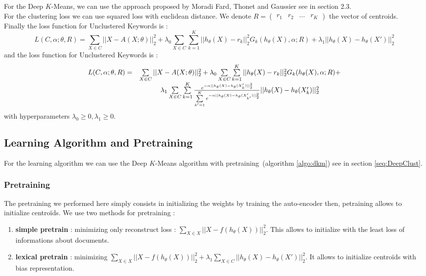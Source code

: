 For the Deep $K$-Means, we can use the approach proposed by Moradi Fard, Thonet and Gaussier 
\cite{Deap-K-Means} see in section 2.3.\\
For the clustering loss we can use squared loss with euclidean distance. We
denote $R = \begin{pmatrix} r_1 & r_2 & ... & r_K\end{pmatrix}$ the vector of
centroids.\\
Finally the loss function for Unclustered Keywords is :
\begin{equation}
L(C ,\alpha;\theta,R) = \sum\limits_{X \in C} ||X - A(X;\theta)||_2^2 + 
\lambda_0 \sum\limits_{X \in C}\sum\limits_{k=1}^K||h_\theta(X) - r_k ||_2^2 G_{k}(h_\theta(X), \alpha; R) + 
\lambda_1|| h_\theta(X) - h_\theta(X')||_2^2
\end{equation}
and the loss function for Unclustered Keywords is :
\begin{equation}
\begin{array}{c c}
L(C ,\alpha;\theta,R) = & \sum\limits_{X \in C} ||X - A(X;\theta)||_2^2 + 
\lambda_0 \sum\limits_{X \in C}\sum\limits_{k=1}^K||h_\theta(X) - r_k ||_2^2 G_{k}(h_\theta(X), \alpha; R) + 
\\ & \lambda_1\sum\limits_{X \in C} \sum\limits_{k = 1}^K \frac{e^{-\alpha|| h_\theta(X) - 
h_\theta(X'_k)||_2^2}}{\sum\limits_{k' = 1}^K e^{-\alpha|| h_\theta(X) - 
h_\theta(X'_{k'})||_2^2}}|| h_\theta(X) - h_\theta(X'_{k})||_2^2
\end{array}
\end{equation}
with hyperparameters $\lambda_0 \geq 0, \lambda_1 \geq 0$.\\

\subsection{Learning Algorithm and Pretraining}

For the learning algorithm we can use the Deep $K$-Means algorithm with 
pretraining~(algorithm \ref{algo:dkm}) see in section \ref{seq:DeepClust}. 
 
\subsubsection{Pretraining}\label{sec:pre}
The pretraining we performed here simply consists in initializing the weights by training 
the auto-encoder then, petraining allows to initialize centroïds.
We use two methods for pretraining : 
\begin{enumerate} 
\item \textbf{simple pretrain} : minimizing only reconstruct loss :
  $\sum\limits_{X \in X} || X - f(h_\theta(X))||_2^2$. This allows to 
  initialize with the least loss of informations about documents.   
\item \textbf{lexical pretrain} : minimizing $\sum\limits_{X \in X} || X - f(h_\theta(X))||_2^2 + 
  \lambda_1 \sum\limits_{X \in C} || h_\theta(X) - h_\theta(X')||_2^2$. 
  It allows to initialize centroïds with bias representation.
\end{enumerate}

